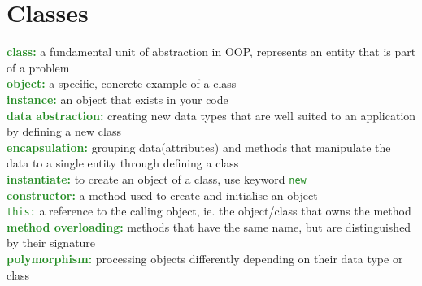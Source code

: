 \documentclass[a4paper,10pt]{article}
\begin{document}
\section{Classes}
\textcolor{ForestGreen}{\textbf{class:}} a fundamental unit of abstraction in OOP, represents an entity that is part of a problem \\ 
\textcolor{ForestGreen}{\textbf{object:}} a specific, concrete example of a class \\ 
\textcolor{ForestGreen}{\textbf{instance:}} an object that exists in your code \\
\textcolor{ForestGreen}{\textbf{data abstraction:}} creating new data types that are well suited to an application by defining a new class \\ 
\textcolor{ForestGreen}{\textbf{encapsulation:}} grouping data(attributes) and methods that manipulate the data to a single entity through defining a class \\
\textcolor{ForestGreen}{\textbf{instantiate:}} to create an object of a class, use keyword \textcolor{ForestGreen}{\texttt{new}} \\  
\textcolor{ForestGreen}{\textbf{constructor:}} a method used to create and initialise an object \\  
\textcolor{ForestGreen}{\texttt{this:}} a reference to the calling object, ie. the object/class that owns the method \\   
\textcolor{ForestGreen}{\textbf{method overloading:}} methods that have the same name, but are distinguished by their signature \\   
\textcolor{ForestGreen}{\textbf{polymorphism:}} processing objects differently depending on their data type or class \\ 
  
\end{document}
